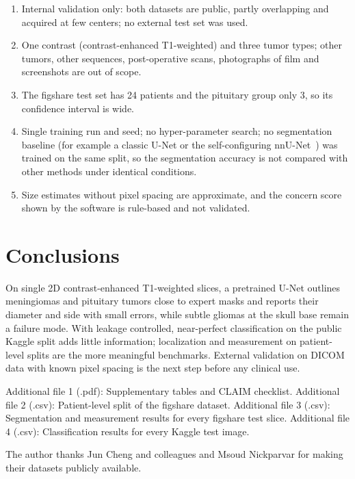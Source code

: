 \documentclass[pdflatex,sn-vancouver-num,iicol]{sn-jnl}
\begin{document}
\begin{enumerate}
\item Internal validation only: both datasets are public, partly overlapping and acquired at few centers; no external test set was used.
\item One contrast (contrast-enhanced T1-weighted) and three tumor types; other tumors, other sequences, post-operative scans, photographs of film and screenshots are out of scope.
\item The figshare test set has 24 patients and the pituitary group only 3, so its confidence interval is wide.
\item Single training run and seed; no hyper-parameter search; no segmentation baseline (for example a classic U-Net or the self-configuring nnU-Net~\cite{isensee2021nnunet}) was trained on the same split, so the segmentation accuracy is not compared with other methods under identical conditions.
\item Size estimates without pixel spacing are approximate, and the concern score shown by the software is rule-based and not validated.
\end{enumerate}

\section{Conclusions}\label{sec:conclusions}

On single 2D contrast-enhanced T1-weighted slices, a pretrained U-Net outlines meningiomas and pituitary tumors close to expert masks and reports their diameter and side with small errors, while subtle gliomas at the skull base remain a failure mode. With leakage controlled, near-perfect classification on the public Kaggle split adds little information; localization and measurement on patient-level splits are the more meaningful benchmarks. External validation on DICOM data with known pixel spacing is the next step before any clinical use.

\backmatter

Additional file 1 (.pdf): Supplementary tables and CLAIM checklist. Additional file 2 (.csv): Patient-level split of the figshare dataset. Additional file 3 (.csv): Segmentation and measurement results for every figshare test slice. Additional file 4 (.csv): Classification results for every Kaggle test image.

The author thanks Jun Cheng and colleagues and Msoud Nickparvar for making their datasets publicly available.
\end{document}
